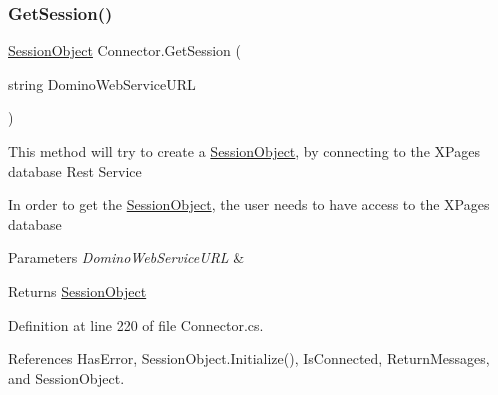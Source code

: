 \subsubsection{\texorpdfstring{Get\+Session()}{GetSession()}}
{\footnotesize\ttfamily \mbox{\hyperlink{class_session_object}{Session\+Object}} Connector.\+Get\+Session (\begin{DoxyParamCaption}\item[{string}]{Domino\+Web\+Service\+U\+RL }\end{DoxyParamCaption})}



This method will try to create a \mbox{\hyperlink{class_session_object}{Session\+Object}}, by connecting to the X\+Pages database Rest Service 

In order to get the \mbox{\hyperlink{class_session_object}{Session\+Object}}, the user needs to have access to the X\+Pages database


\begin{DoxyParams}{Parameters}
{\em Domino\+Web\+Service\+U\+RL} & \\
\hline
\end{DoxyParams}
\begin{DoxyReturn}{Returns}
\mbox{\hyperlink{class_session_object}{Session\+Object}}
\end{DoxyReturn}


Definition at line 220 of file Connector.\+cs.



References Has\+Error, Session\+Object.\+Initialize(), Is\+Connected, Return\+Messages, and Session\+Object.


